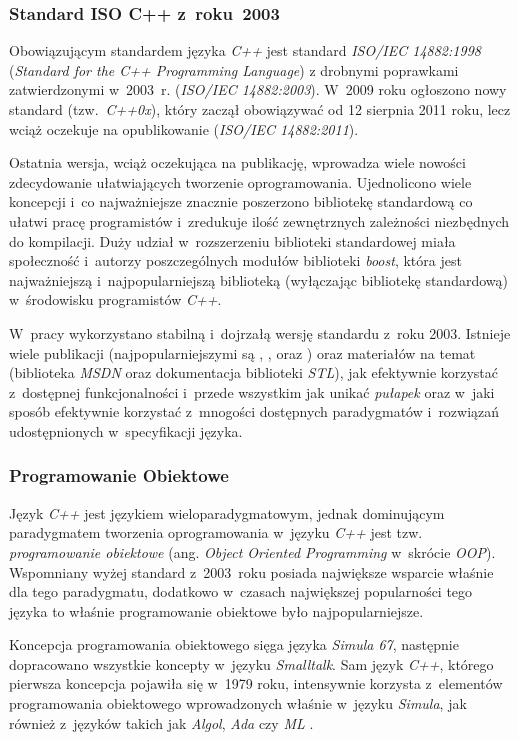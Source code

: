       \subsubsection{Standard ISO C++ z~roku~2003}
      Obowiązującym standardem języka \textit{C++} jest standard \textit{ISO/IEC 14882:1998} (\textit{Standard for the C++ Programming Language}) z drobnymi poprawkami zatwierdzonymi w~2003~r. (\textit{ISO/IEC 14882:2003}). W~2009 roku ogłoszono nowy standard (tzw.~\textit{C++0x}), który zaczął obowiązywać od 12 sierpnia 2011 roku, lecz wciąż oczekuje na opublikowanie (\textit{ISO/IEC 14882:2011}).

      Ostatnia wersja, wciąż oczekująca na publikację, wprowadza wiele nowości zdecydowanie ułatwiających tworzenie oprogramowania. Ujednolicono wiele koncepcji i~co najważniejsze znacznie poszerzono bibliotekę standardową co ułatwi pracę programistów i~zredukuje ilość zewnętrznych zależności niezbędnych do kompilacji. Duży udział w~rozszerzeniu biblioteki standardowej miała społeczność i~autorzy poszczególnych modułów biblioteki \textit{boost}, która jest najważniejszą i~najpopularniejszą biblioteką (wyłączając bibliotekę standardową) w~środowisku programistów \textit{C++}.

      W~pracy wykorzystano stabilną i~dojrzałą wersję standardu z~roku 2003. Istnieje wiele publikacji (najpopularniejszymi są \cite{EffectiveCpp}, \cite{MoreEffectiveCpp}, \cite{EffectiveStl} oraz \cite{Alexandrescu}) oraz materiałów na temat (biblioteka \textit{MSDN} oraz dokumentacja biblioteki \textit{STL}), jak efektywnie korzystać z~dostępnej funkcjonalności i~przede wszystkim jak unikać \textit{pułapek} oraz w~jaki sposób efektywnie korzystać z~mnogości dostępnych paradygmatów i~rozwiązań udostępnionych w~specyfikacji języka.

      \subsubsection{Programowanie Obiektowe}
      Język \textit{C++} jest językiem wieloparadygmatowym, jednak dominującym paradygmatem tworzenia oprogramowania w~języku \textit{C++} jest tzw. \textit{programowanie obiektowe} (ang. \textit{Object Oriented Programming} w~skrócie \textit{OOP}). Wspomniany wyżej standard z~2003~roku posiada największe wsparcie właśnie dla tego paradygmatu, dodatkowo w~czasach największej popularności tego języka to właśnie programowanie obiektowe było najpopularniejsze.

      Koncepcja programowania obiektowego sięga języka \textit{Simula 67}, następnie dopracowano wszystkie koncepty w~języku \textit{Smalltalk}. Sam język \textit{C++}, którego pierwsza koncepcja pojawiła się w~1979 roku, intensywnie korzysta z~elementów programowania obiektowego wprowadzonych właśnie w~języku \textit{Simula}, jak również z~języków takich jak \textit{Algol}, \textit{Ada} czy \textit{ML} \cite{CppStroustrup}.

